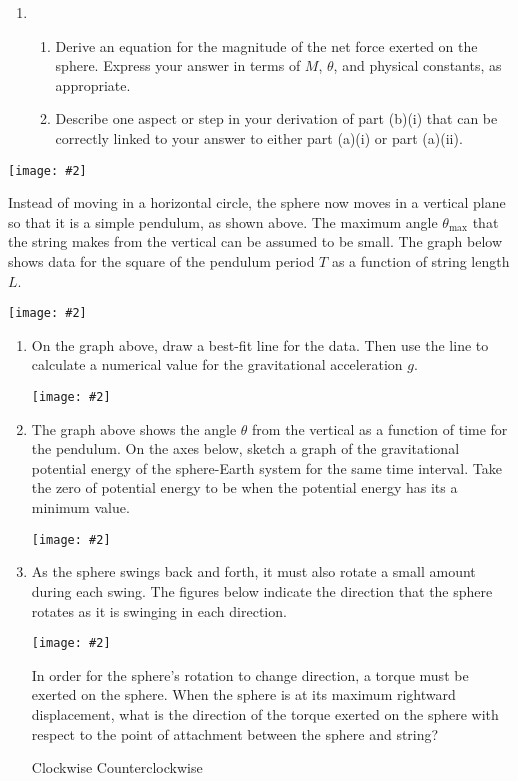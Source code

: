 \documentclass[11pt]{article}
\newcommand{\pic}[2]{
  \begin{center}\texttt{[image: \#2]}\end{center}
}
\begin{document}
\begin{enumerate}[leftmargin=18pt]
\begin{enumerate}[leftmargin=18pt]
  \item
    \begin{enumerate}[leftmargin=18pt]
    \item Derive an equation for the magnitude of the net force exerted on
      the sphere. Express your answer in terms of $M$, $\theta$, and physical
      constants, as appropriate.
    \item Describe one aspect or step in your derivation of part (b)(i) that
      can be correctly linked to your answer to either part (a)(i) or part
      (a)(ii).
    \end{enumerate}
  \end{enumerate}
  \newpage

  \pic{.3}{swing-backandforth}
  Instead of moving in a horizontal circle, the sphere now moves in a vertical
  plane so that it is a simple pendulum, as shown above. The maximum angle
  $\theta_\mathrm{max}$ that the string makes from the vertical can be assumed
  to be small. The graph below shows data for the square of the pendulum period
  $T$ as a function of string length $L$.

  \pic{.5}{T2-L}
  \begin{enumerate}[leftmargin=18pt,resume]
  \item On the graph above, draw a best-fit line for the data. Then use the
    line to calculate a numerical value for the gravitational acceleration $g$.
    \newpage

    \pic{.4}{sinusoidal}
  \item The graph above shows the angle $\theta$ from the vertical as a function
    of time for the pendulum. On the axes below, sketch a graph of the
    gravitational potential energy of the sphere-Earth system for the same time
    interval. Take the zero of potential energy to be when the potential energy
    has its a minimum value.

    \pic{.45}{graph-paper}
  \item As the sphere swings back and forth, it must also rotate a small amount
    during each swing. The figures below indicate the direction that the sphere
    rotates as it is swinging in each direction.
    \pic{.5}{swings}
    In order for the sphere's rotation to change direction, a torque must be
    exerted on the sphere. When the sphere is at its maximum rightward
    displacement, what is the direction of the torque exerted on the sphere
    with respect to the point of attachment between the sphere and string?

    \vspace{.1in}
    \underline{\hspace{.3in}} Clockwise\hspace{.3in}
    \underline{\hspace{.3in}} Counterclockwise
        

\end{enumerate}
\end{enumerate}
\end{document}
